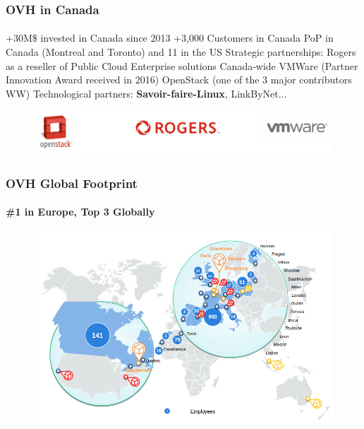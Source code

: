 \documentclass{beamer}
\begin{document}
	\begin{frame}
	\frametitle{OVH in Canada}
	\framesubtitle{}
		\begin{outline}
			\1 +30M\$ invested in Canada since 2013 
			\1 +3,000 Customers in Canada
			 PoP in Canada (Montreal and Toronto) and 11 in the US
			\1 Strategic partnerships:
				\2 Rogers as a reseller of Public Cloud Enterprise solutions Canada-wide 
				\2 VMWare (Partner Innovation Award received in 2016)
				\2 OpenStack (one of the 3 major contributors WW)
			\1 Technological partners: \textbf{Savoir-faire-Linux}, LinkByNet...%
		\end{outline}
	        \begin{figure}[h]
                \centering
                \includegraphics[width=.8\textwidth]{./images/OpenStack-Rogers-VMWare}
        	\end{figure}
	\end{frame}

	\begin{frame}
	\frametitle{OVH Global Footprint}
	\framesubtitle{\#1 in Europe, Top 3 Globally}
	        \begin{figure}[h]
                \centering
                \includegraphics[width=.8\textwidth]{./images/OVH-global_presence}
        	\end{figure}
	\end{frame}
\end{document}
